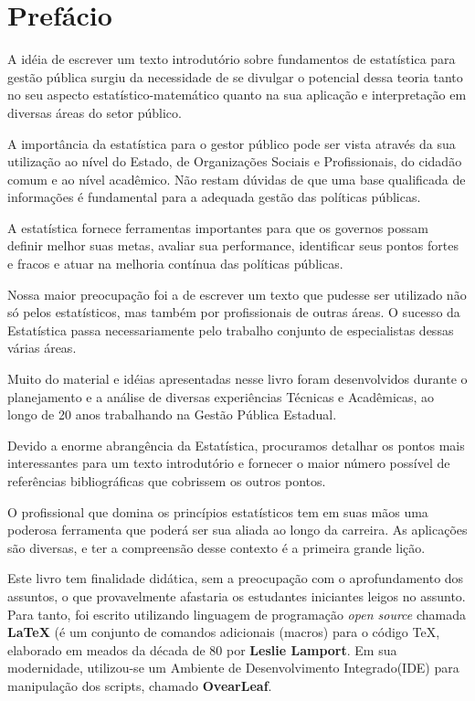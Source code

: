 \chapter*{Prefácio}

\inic A idéia de escrever um texto introdutório sobre fundamentos de estatística para gestão pública surgiu da necessidade de se divulgar o potencial dessa teoria tanto no
seu aspecto estatístico-matemático quanto na sua aplicação e
interpretação em diversas áreas do setor público.\vst

A importância da estatística para o gestor público pode ser vista através da sua utilização ao nível do Estado, de Organizações Sociais e Profissionais, do cidadão comum e ao nível acadêmico. Não restam dúvidas de que uma base qualificada de informações é fundamental para a adequada gestão das políticas públicas.\vst  

A estatística fornece ferramentas importantes para que os governos possam definir melhor suas metas, avaliar sua performance, identificar seus pontos fortes e fracos e atuar na melhoria contínua das políticas públicas.
\vst

Nossa maior preocupação foi a de escrever um texto que pudesse ser
utilizado não só pelos estatísticos, mas também por profissionais de outras áreas. O sucesso da Estatística passa necessariamente
pelo trabalho conjunto de especialistas dessas várias áreas. \vst

Muito do material e idéias apresentadas nesse livro foram
desenvolvidos durante o planejamento e a análise de diversas experiências Técnicas e Acadêmicas, ao longo de 20 anos trabalhando na Gestão Pública Estadual.
\vst 


Devido a enorme abrangência da Estatística, procuramos detalhar os pontos mais interessantes para um texto introdutório e fornecer o maior número possível de referências bibliográficas que cobrissem os outros pontos.\vst

O profissional que domina os princípios estatísticos tem em suas mãos uma poderosa ferramenta que poderá ser sua aliada ao longo da carreira. As aplicações são diversas, e ter a compreensão desse contexto é a primeira grande lição.
\vst

\newpage
Este livro tem finalidade didática, sem a preocupação com o aprofundamento dos assuntos, o que provavelmente afastaria os estudantes iniciantes leigos no assunto. Para tanto, foi escrito utilizando linguagem de programação \textit{open source} chamada \textbf{\LaTeX} (é um conjunto de comandos adicionais (macros) para o código \TeX, elaborado em meados da década de 80 por \textbf{Leslie Lamport}. Em sua modernidade, utilizou-se um Ambiente de Desenvolvimento Integrado(IDE) para manipulação dos scripts, chamado \textbf{OvearLeaf}. \vst


